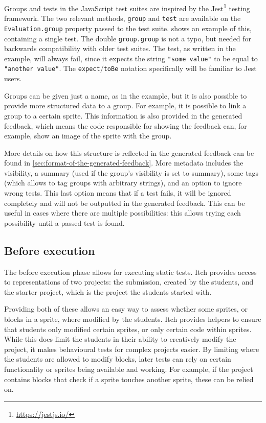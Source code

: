 \documentclass[../main]{subfiles}
\begin{document}
Groups and tests in the JavaScript test suites are inspired by the Jest\footnote{\url{https://jestjs.io/}} testing framework.
The two relevant methods, \texttt{group} and \texttt{test} are available on the \texttt{Evaluation.group} property passed to the test suite.
 shows an example of this, containing a single test.
The double \texttt{group.group} is not a typo, but needed for backwards compatibility with older test suites.
The test, as written in the example, will always fail, since it expects the string \texttt{"some value"} to be equal to \texttt{"another value"}.
The \texttt{expect}/\texttt{toBe} notation specifically will be familiar to Jest users.

Groups can be given just a name, as in the example, but it is also possible to provide more structured data to a group.
For example, it is possible to link a group to a certain sprite.
This information is also provided in the generated feedback, which means the code responsible for showing the feedback can, for example, show an image of the sprite with the group.

More details on how this structure is reflected in the generated feedback can be found in \cref{sec:format-of-the-generated-feedback}.
More metadata includes the visibility, a summary (used if the group's visibility is set to summary), some tags (which allows to tag groups with arbitrary strings), and an option to ignore wrong tests.
This last option means that if a test fails, it will be ignored completely and will not be outputted in the generated feedback.
This can be useful in cases where there are multiple possibilities: this allows trying each possibility until a passed test is found.

\subsection{Before execution}\label{subsec:before-execution}

The before execution phase allows for executing static tests.
Itch provides access to representations of two projects: the submission, created by the students, and the starter project, which is the project the students started with.

Providing both of these allows an easy way to assess whether some sprites, or blocks in a sprite, where modified by the students.
Itch provides helpers to ensure that students only modified certain sprites, or only certain code within sprites.
While this does limit the students in their ability to creatively modify the project, it makes behavioural tests for complex projects easier.
By limiting where the students are allowed to modify blocks, later tests can rely on certain functionality or sprites being available and working.
For example, if the project contains blocks that check if a sprite touches another sprite, these can be relied on.
\end{document}
